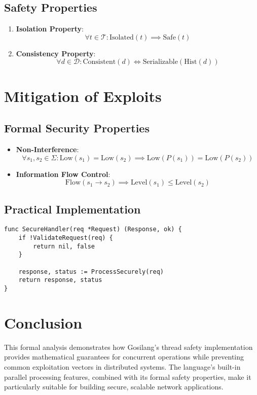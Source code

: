 \documentclass{article}
\begin{document}
\subsection{Safety Properties}
\begin{enumerate}
    \item \textbf{Isolation Property}:
    \[
    \forall t \in \mathcal{T}: \text{Isolated}(t) \implies \text{Safe}(t)
    \]
    
    \item \textbf{Consistency Property}:
    \[
    \forall d \in \mathcal{D}: \text{Consistent}(d) \iff \text{Serializable}(\text{Hist}(d))
    \]
\end{enumerate}

\section{Mitigation of Exploits}
\subsection{Formal Security Properties}
\begin{itemize}
    \item \textbf{Non-Interference}:
    \[
    \forall s_1, s_2 \in \Sigma: \text{Low}(s_1) = \text{Low}(s_2) \implies \text{Low}(P(s_1)) = \text{Low}(P(s_2))
    \]
    
    \item \textbf{Information Flow Control}:
    \[
    \text{Flow}(s_1 \to s_2) \implies \text{Level}(s_1) \leq \text{Level}(s_2)
    \]
\end{itemize}

\subsection{Practical Implementation}
\begin{tcolorbox}[title=Exploit Prevention Pattern]
\begin{verbatim}
func SecureHandler(req *Request) (Response, ok) {
    if !ValidateRequest(req) {
        return nil, false
    }
    
    response, status := ProcessSecurely(req)
    return response, status
}
\end{verbatim}
\end{tcolorbox}

\section{Conclusion}
This formal analysis demonstrates how Gosilang's thread safety implementation provides mathematical guarantees for concurrent operations while preventing common exploitation vectors in distributed systems. The language's built-in parallel processing features, combined with its formal safety properties, make it particularly suitable for building secure, scalable network applications.
\end{document}
